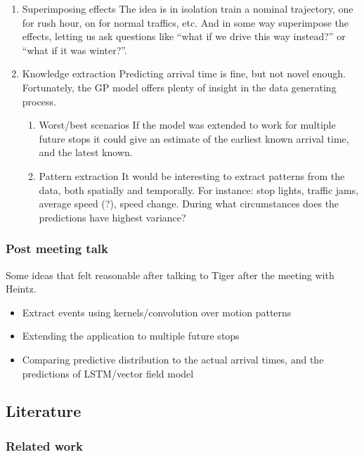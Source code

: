 \documentclass[11pt]{article}
\begin{document}
\begin{enumerate}
\item Superimposing effects
\label{sec:org2a87f74}
The idea is in isolation train a nominal trajectory, one for rush
hour, on for normal traffics, etc. And in some way superimpose
the effects, letting us ask questions like ``what if we drive
this way instead?'' or  ``what if it was winter?''.

\item Knowledge extraction
\label{sec:orgd70e2bf}
Predicting arrival time is fine, but not novel
enough. Fortunately, the GP model offers plenty of insight in the
data generating process. 

\begin{enumerate}
\item Worst/best scenarios
\label{sec:org484a53b}
If the model was extended to work for
multiple future stops it could give an estimate of the earliest
known arrival time, and the latest known. 

\item Pattern extraction
\label{sec:orgc9735b7}
It would be interesting to extract patterns from the
data, both spatially and temporally. For instance: stop lights, 
traffic jams, average speed (?), speed change. During what circumstances
does the predictions have highest variance?
\end{enumerate}
\end{enumerate}

\subsubsection{Post meeting talk}
\label{sec:org9c3f87a}
Some ideas that felt reasonable after talking to Tiger after the
meeting with Heintz.
\begin{itemize}
\item Extract events using kernels/convolution over motion patterns
\item Extending the application to multiple future stops
\item Comparing predictive distribution to the actual arrival times,
and the predictions of LSTM/vector field model
\end{itemize}

\subsection{Literature}
\label{sec:orgdf29339}
\subsubsection{Related work}
\label{sec:orgd458d71}
\end{document}
